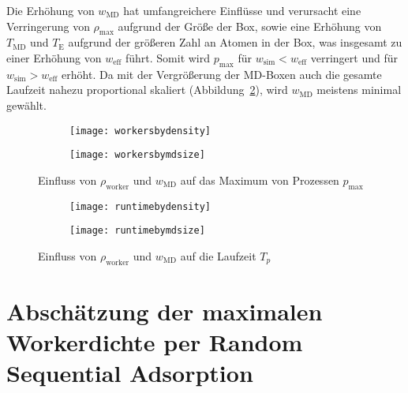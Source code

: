 Die Erhöhung von $w_\text{MD}$ hat umfangreichere Einflüsse und verursacht eine Verringerung von $\rho_\text{max}$ aufgrund der Größe der Box, sowie eine Erhöhung von $T_\text{MD}$ und $T_\text{E}$ aufgrund der größeren Zahl an Atomen in der Box, was insgesamt zu einer Erhöhung von $w_\text{eff}$ führt.
Somit wird $p_\text{max}$ für $w_\text{sim} < w_\text{eff}$ verringert und für $w_\text{sim} > w_\text{eff}$ erhöht.
Da mit der Vergrößerung der MD-Boxen auch die gesamte Laufzeit nahezu proportional skaliert (Abbildung~\ref{fig:tpother}), wird $w_\text{MD}$ meistens minimal gewählt.

\begin{figure}[p]

  \captionsetup[subfigure]{singlelinecheck=false}
  \def\subfigwidth{7cm}
  \begin{subfigure}[t]{\subfigwidth}
    \texttt{[image: workersbydensity]}
  \end{subfigure}
  \hfill
  \begin{subfigure}[t]{\subfigwidth}
    \texttt{[image: workersbymdsize]}
  \end{subfigure}

  \caption{Einfluss von $\rho_\text{worker}$ und $w_\text{MD}$ auf das Maximum von Prozessen $p_\text{max}$}
  \label{fig:pmaxother}

\end{figure}

\begin{figure}[p]

  \captionsetup[subfigure]{singlelinecheck=false}
  \def\subfigwidth{7cm}
  \begin{subfigure}[t]{\subfigwidth}
    \texttt{[image: runtimebydensity]}
  \end{subfigure}
  \hfill
  \begin{subfigure}[t]{\subfigwidth}
    \texttt{[image: runtimebymdsize]}
  \end{subfigure}

  \caption{Einfluss von $\rho_\text{worker}$ und $w_\text{MD}$ auf die Laufzeit $T_p$}
  \label{fig:tpother}

\end{figure}

\clearpage

\section{Abschätzung der maximalen Workerdichte per Random Sequential Adsorption}
\label{appendix_rsamaxdensity}


